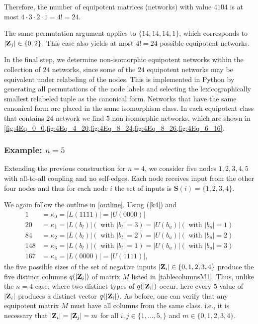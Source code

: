 \documentclass[12pt]{amsart}
\newcommand{\bZ}{{\bf Z}}
\newcommand{\Sources}{\mathbf{S}}
\theoremstyle{definition}
\begin{document}
Therefore, the number of equipotent matrices (networks) with value $4104$ is at most \(4\cdot 3\cdot 2\cdot 1 = 4! = 24\).

The same permutation argument applies to \(\{14,14,14,1\}\), which corresponds to $|\bZ_j|\in\{0,2\}.$ This case also yields at most $4! = 24$ possible equipotent networks.

In the final step, we determine non-isomorphic equipotent networks within the collection of $24$ networks, since some of the $24$ equipotent networks may be equivalent under relabeling of the nodes. This is implemented in Python by generating all permutations of the node labels and selecting the lexicographically smallest relabeled tuple as the canonical form. Networks that have the same canonical form are placed in the same isomorphism class. In each equipotent class that contains $24$ network we find $5$ non-isomorphic networks, which are shown in \cref{fig:4Eq_0_0,fig:4Eq_4_20,fig:4Eq_8_24,fig:4Eq_8_26,fig:4Eq_6_16}.

\subsubsection*{Example: $n=5$ }
Extending the previous construction for $n=4$, we consider five nodes $1,2,3,4,5$ with all-to-all coupling and no self-edges. Each node receives input from the other four nodes and thus for each node $i$ the set of inputs is $\Sources(i)=\{1,2,3,4\}.$

We again follow the outline in \cref{outline}. Using (\ref{k4}) and 
\begin{align} \label{k5}
    1 &= \kappa_0 = |L(1111)|=|U(0000)| \nonumber \\
    20  &= \kappa_1 = |L(b_l)| (\mbox{ with }|b_l|=3) = |U(b_u)| ( \mbox{ with }|b_u|=1) \\
    84 &= \kappa_2 = |L(b_l)| (\mbox{ with }|b_l|=2) = |U(b_u)| ( \mbox{ with }|b_u|=2) \nonumber\\
    148 &= \kappa_3 =|L(b_l)| (\mbox{ with }|b_l|=1) = |U(b_u)| ( \mbox{ with }|b_u|=3) \nonumber\\
    167 &= \kappa_4 = |L(0000)|=|U(1111)| \nonumber,
\end{align}
the five possible sizes of the set of negative inputs $|\bZ_i|\in\{0,1,2,3,4\}$ produce the five distinct columns $q(|\bZ_i|)$ of matrix $M$ listed in \cref{tablecolumnsM1}.
Thus, unlike the $n=4$ case, where two distinct types of $q(|\bZ_i|)$ occur, here every $5$ value of $|\bZ_i|$ produces a distinct vector $q(|\bZ_i|)$. 
As before, one can verify that any equipotent matrix $M$ must have all columns from the same class. i.e., it is necessary that 
$|\bZ_i|=|\bZ_j|=m$ for all $ i,j \in \{1,\dots,5,\}$ and $m \in \{0,1,2,3,4\}$. 
\end{document}
